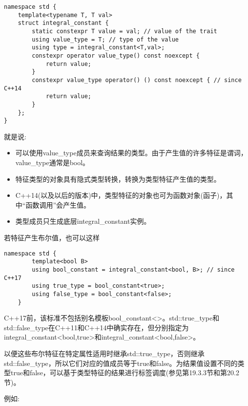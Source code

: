 \begin{lstlisting}[style=styleCXX]
namespace std {
	template<typename T, T val>
	struct integral_constant {
		static constexpr T value = val; // value of the trait
		using value_type = T; // type of the value
		using type = integral_constant<T,val>;
		constexpr operator value_type() const noexcept {
			return value;
		}
		constexpr value_type operator() () const noexcept { // since C++14
			return value;
		}
	};
}
\end{lstlisting}

就是说:

\begin{itemize}
\item 
可以使用value\_type成员来查询结果的类型。由于产生值的许多特征是谓词，value\_type通常是bool。

\item 
特征类型的对象具有隐式类型转换，转换为类型特征产生值的类型。

\item 
C++14(以及以后的版本)中，类型特征的对象也可为函数对象(函子)，其中“函数调用”会产生值。

\item 
类型成员只生成底层integral\_constant实例。
\end{itemize}

若特征产生布尔值，也可以这样

\begin{lstlisting}[style=styleCXX]
	namespace std {
		template<bool B>
		using bool_constant = integral_constant<bool, B>; // since C++17
		using true_type = bool_constant<true>;
		using false_type = bool_constant<false>;
	}
\end{lstlisting}

\begin{tcolorbox}[colback=webgreen!5!white,colframe=webgreen!75!black]
\hspace*{0.75cm}C++17前，该标准不包括别名模板bool\_constant<>。std::true\_type和std::false\_type在C++11和C++14中确实存在，但分别指定为integral\_constant<bool,true>和integral\_constant<bool,false>。
\end{tcolorbox}

以便这些布尔特征在特定属性适用时继承std::true\_type，否则继承std::false\_type，所以它们对应的值成员等于true和false。为结果值设置不同的类型true和false，可以基于类型特征的结果进行标签调度(参见第19.3.3节和第20.2节)。

例如:

